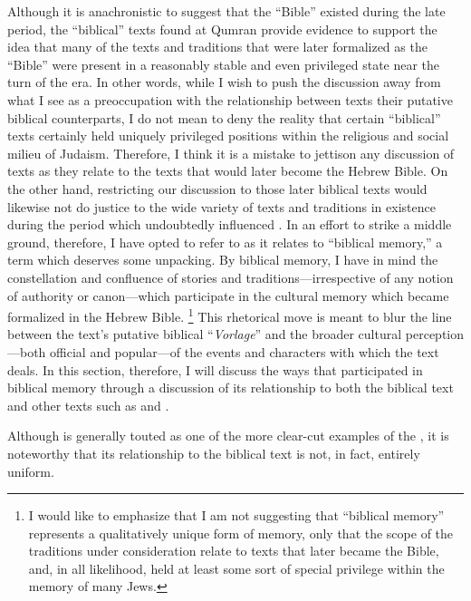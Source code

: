 Although it is anachronistic to suggest that the ``Bible''  existed during the late \secondtemple period, the ``biblical'' texts found at Qumran provide evidence to support the idea that many of the texts and traditions that were later formalized as the ``Bible'' were present in a reasonably stable and even privileged state near the turn of the era. In other words, while I wish to push the discussion away from what I see as a preoccupation with the relationship between \rwb texts their putative biblical counterparts, I do not mean to deny the reality that certain ``biblical'' texts certainly held uniquely privileged positions within the religious and social milieu of \secondtemple Judaism. Therefore, I think it is a mistake to jettison any discussion of \rwb texts as they relate to the texts that would later become the Hebrew Bible. On the other hand, restricting our discussion to those later biblical texts would likewise not do justice to the wide variety of texts and traditions in existence during the \secondtemple period which undoubtedly influenced \ga. In an effort to strike a middle ground, therefore, I have opted to refer to \ga as it relates to ``biblical memory,'' a term which deserves some unpacking. By biblical memory, I have in mind the constellation and confluence of stories and traditions---irrespective of any notion of authority or canon---which participate in the cultural memory which became formalized in the Hebrew Bible.%
    \footnote{I would like to emphasize that I am not suggesting that ``biblical memory'' represents a qualitatively unique form of memory, only that the scope of the traditions under consideration relate to texts that later became the Bible, and, in all likelihood, held at least some sort of special privilege within the memory of many \secondtemple Jews.}
This rhetorical move is meant to blur the line between the \rwb text's putative biblical ``\emph{Vorlage}'' and the broader cultural perception---both official and popular---of the events and characters with which the \rwb text deals. In this section, therefore, I will discuss the ways that \ga participated in biblical memory through a discussion of its relationship to both the biblical text and other \secondtemple texts such as \jub and \firstenoch.

Although \ga is generally touted as one of the more clear-cut examples of the \rwb, it is noteworthy that its relationship to the biblical text is not, in fact, entirely uniform.%
    \autocite[333]{bernstein_berthelot-etal2010}

